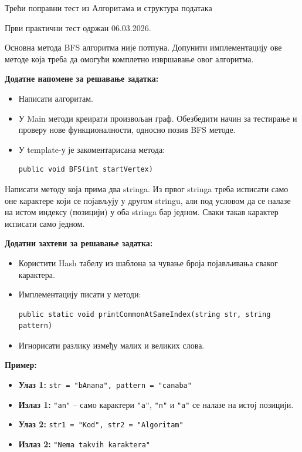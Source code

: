 
Трећи поправни тест из Алгоритама и структура података

Први практични тест одржан 06.03.2026.

Основна метода BFS алгоритма није потпуна. Допунити имплементацију ове методе која треба да омогући комплетно извршавање овог алгоритма.

\textbf{Додатне напомене за решавање задатка:}
\begin{itemize}
	\item Написати алгоритам.
	\item У Main методи креирати произвољан граф. Обезбедити начин за тестирање и проверу нове функционалности, односно позив BFS методе.
	\item У template-у је закоментарисана метода:
	\begin{Verbatim}[fontsize=\small]
public void BFS(int startVertex)
	\end{Verbatim}
\end{itemize}

Написати методу која прима два stringa. Из првог stringa треба исписати само оне карактере који се појављују у другом stringu, али под условом да се налазе на истом индексу (позицији) у оба stringa бар једном. Сваки такав карактер исписати само једном.

\textbf{Додатни захтеви за решавање задатка:}
\begin{itemize}
	\item Користити Hash табелу из шаблона за чување броја појављивања сваког карактера.
	\item Имплементацију писати у методи:
	\begin{Verbatim}[fontsize=\small]
public static void printCommonAtSameIndex(string str, string pattern)
	\end{Verbatim}
	\item Игнорисати разлику између малих и великих слова.
\end{itemize}

\textbf{Пример:}
\begin{itemize}
	\item \textbf{Улаз 1:} \texttt{str = "bAnana", pattern = "canaba"}
	\item \textbf{Излаз 1:} \texttt{"an"} -- само карактери \texttt{"a"}, \texttt{"n"} и \texttt{"a"} се налазе на истој позицији.
	\item \textbf{Улаз 2:} \texttt{str1 = "Kod", str2 = "Algoritam"}
	\item \textbf{Излаз 2:} \texttt{"Nema takvih karaktera"}
\end{itemize}

